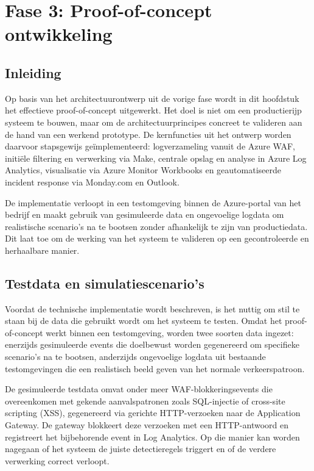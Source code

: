 \chapter{Fase 3: Proof-of-concept ontwikkeling}
\label{ch:proof-of-concept ontwikkeling}

\section{Inleiding}

Op basis van het architectuurontwerp uit de vorige fase wordt in dit hoofdstuk het effectieve proof-of-concept uitgewerkt. Het doel is niet om een productierijp systeem te bouwen, maar om de architectuurprincipes concreet te valideren aan de hand van een werkend prototype. De kernfuncties uit het ontwerp worden daarvoor stapsgewijs geïmplementeerd: logverzameling vanuit de Azure WAF, initiële filtering en verwerking via Make, centrale opslag en analyse in Azure Log Analytics, visualisatie via Azure Monitor Workbooks en geautomatiseerde incident response via Monday.com en Outlook.

De implementatie verloopt in een testomgeving binnen de Azure-portal van het bedrijf en maakt gebruik van gesimuleerde data en ongevoelige logdata om realistische scenario's na te bootsen zonder afhankelijk te zijn van productiedata. Dit laat toe om de werking van het systeem te valideren op een gecontroleerde en herhaalbare manier.

\newpage


\section{Testdata en simulatiescenario's}
Voordat de technische implementatie wordt beschreven, is het nuttig om stil te staan bij de data die gebruikt wordt om het systeem te testen. Omdat het proof-of-concept werkt binnen een testomgeving, worden twee soorten data ingezet: enerzijds gesimuleerde events die doelbewust worden gegenereerd om specifieke scenario's na te bootsen, anderzijds ongevoelige logdata uit bestaande testomgevingen die een realistisch beeld geven van het normale verkeerspatroon.

De gesimuleerde testdata omvat onder meer WAF-blokkeringsevents die overeenkomen met gekende aanvalspatronen zoals SQL-injectie of cross-site scripting (XSS), gegenereerd via gerichte HTTP-verzoeken naar de Application Gateway. De gateway blokkeert deze verzoeken met een HTTP-antwoord en registreert het bijbehorende event in Log Analytics. Op die manier kan worden nagegaan of het systeem de juiste detectieregels triggert en of de verdere verwerking correct verloopt.

